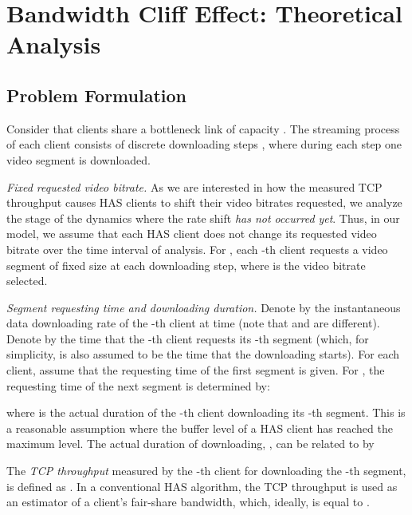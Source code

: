 \documentclass[conference]{IEEEtran}
\theoremstyle{plain}
\theoremstyle{definition}
\theoremstyle{plain}
\theoremstyle{plain}
\begin{document}
{\scriptsize





}


\appendices{}


\section{Bandwidth Cliff Effect: Theoretical Analysis\label{sec:Bandwidth-Cliff-Effect:}}


\subsection{Problem Formulation\label{sec:Problem-Formulation}}

Consider that  clients share a bottleneck link of capacity .
The streaming process of each client consists of discrete downloading
steps , where during each step one video segment is downloaded. 

\vspace{0.05in}

\emph{Fixed requested video bitrate.} As we are interested in how
the measured TCP throughput causes HAS clients to shift their video
bitrates requested, we analyze the stage of the dynamics where the
rate shift \emph{has not occurred} \emph{yet}. Thus, in our model,
we assume that each HAS client does not change its requested video
bitrate over the time interval of analysis. For , each
-th client requests a video segment of fixed size 
at each downloading step, where  is the video
bitrate selected.

\vspace{0.05in}

\emph{Segment requesting time and downloading duration. }Denote by
 the instantaneous data downloading rate of the -th
client at time  (note that  and  are different).
Denote by  the time that the -th client requests its
-th segment (which, for simplicity, is also assumed to be the
time that the downloading starts). For each client, assume that the
requesting time of the first segment  is given. For ,
the requesting time of the next segment is determined by:

where  is the actual duration of the -th client
downloading its -th segment. This is a reasonable assumption where
the buffer level of a HAS client has reached the maximum level. The
actual duration of downloading, , can be related
to  by

The \emph{TCP throughput} measured by the -th client for downloading
the -th segment, is defined as .
In a conventional HAS algorithm, the TCP throughput is used as an
estimator of a client's fair-share bandwidth, which, ideally, is equal
to .
\end{document}
